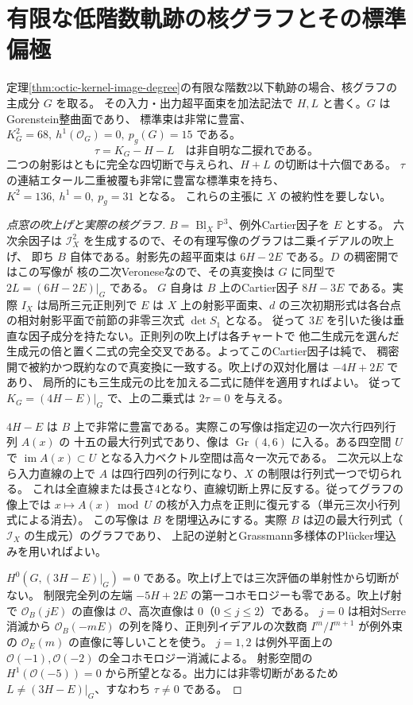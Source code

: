 \section{有限な低階数軌跡の核グラフとその標準偏極}
\label{sec:octic-kernel-canonical-model}
\begin{theorem}\label{thm:octic-kernel-canonical-model}
定理\ref{thm:octic-kernel-image-degree}の有限な階数2以下軌跡の場合、核グラフの主成分 $G$ を取る。
その入力・出力超平面束を加法記法で $H,L$ と書く。$G$ はGorenstein整曲面であり、
標準束は非常に豊富、$K_G^2=68,\ h^1(\mathcal O_G)=0,\ p_g(G)=15$ である。
\[
             \tau=K_G-H-L\quad\text{は非自明な二捩れである。}
\]
二つの射影はともに完全な四切断で与えられ、$H+L$ の切断は十六個である。
$\tau$ の連結エタール二重被覆も非常に豊富な標準束を持ち、$K^2=136,\ h^1=0,\ p_g=31$ となる。
これらの主張に $X$ の被約性を要しない。
\end{theorem}
\begin{proof}[点窓の吹上げと実際の核グラフ]
$B=\operatorname{Bl}_X\mathbb P^3$、例外Cartier因子を $E$ とする。
六次余因子は $\mathcal I_X^2$ を生成するので、その有理写像のグラフは二乗イデアルの吹上げ、
即ち $B$ 自体である。射影先の超平面束は $6H-2E$ である。$D$ の稠密開ではこの写像が
核の二次Veroneseなので、その真変換は $G$ に同型で $2L=(6H-2E)|_G$ である。
$G$ 自身は $B$ 上のCartier因子 $8H-3E$ である。実際 $I_X$ は局所三元正則列で
$E$ は $X$ 上の射影平面束、$d$ の三次初期形式は各台点の相対射影平面で前節の非零三次式 $\det S_1$ となる。
従って $3E$ を引いた後は垂直な因子成分を持たない。正則列の吹上げは各チャートで
他二生成元を選んだ生成元の倍と置く二式の完全交叉である。よってこのCartier因子は純で、
稠密開で被約かつ既約なので真変換に一致する。吹上げの双対化層は $-4H+2E$ であり、
局所的にも三生成元の比を加える二式に随伴を適用すればよい。
従って $K_G=(4H-E)|_G$ で、上の二乗式は $2\tau=0$ を与える。

$4H-E$ は $B$ 上で非常に豊富である。実際この写像は指定辺の一次六行四列行列 $A(x)$ の
十五の最大行列式であり、像は $\operatorname{Gr}(4,6)$ に入る。ある四空間 $U$ で
$\operatorname{im} A(x)\subset U$ となる入力ベクトル空間は高々一次元である。
二次元以上なら入力直線の上で $A$ は四行四列の行列になり、$X$ の制限は行列式一つで切られる。
これは全直線または長さ4となり、直線切断上界に反する。従ってグラフの像上では
$x\mapsto A(x)\bmod U$ の核が入力点を正則に復元する（単元三次小行列式による消去）。
この写像は $B$ を閉埋込みにする。実際 $B$ は辺の最大行列式（$\mathcal I_X$ の生成元）のグラフであり、
上記の逆射とGrassmann多様体のPlücker埋込みを用いればよい。

$H^0(G,(3H-E)|_G)=0$ である。吹上げ上では三次評価の単射性から切断がない。
制限完全列の左端 $-5H+2E$ の第一コホモロジーも零である。吹上げ射で
$\mathcal O_B(jE)$ の直像は $\mathcal O$、高次直像は $0$（$0\le j\le2$）である。
$j=0$ は相対Serre消滅から $\mathcal O_B(-mE)$ の列を降り、正則列イデアルの次数商
$I^m/I^{m+1}$ が例外束の $\mathcal O_E(m)$ の直像に等しいことを使う。
$j=1,2$ は例外平面上の $\mathcal O(-1),\mathcal O(-2)$ の全コホモロジー消滅による。
射影空間の $H^1(\mathcal O(-5))=0$ から所望となる。出力には非零切断があるため $L\ne(3H-E)|_G$、すなわち $\tau\ne0$ である。
\end{proof}

